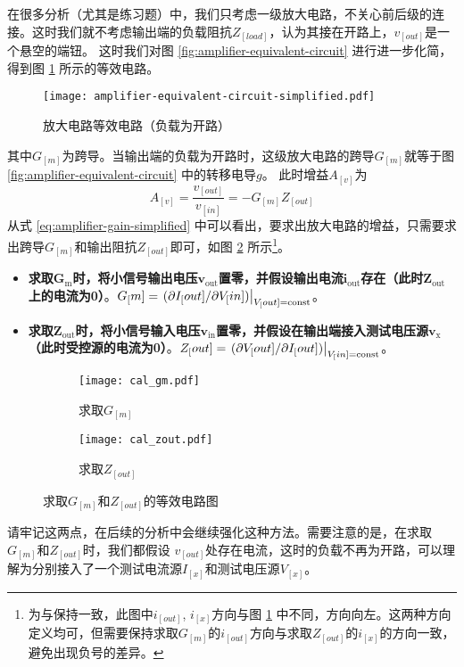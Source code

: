 在很多分析（尤其是练习题）中，我们只考虑一级放大电路，不关心前后级的连接。这时我们就不考虑输出端的负载阻抗$Z_[load]$，认为其接在开路上，$v_[out]$是一个悬空的端钮。
这时我们对图 \ref{fig:amplifier-equivalent-circuit} 进行进一步化简，得到图 \ref{fig:amplifier-equivalent-circuit-simplified} 所示的等效电路。
\begin{figure}[h!tb]
    \centering
    \texttt{[image: amplifier-equivalent-circuit-simplified.pdf]}
    \caption{放大电路等效电路（负载为开路）}
    \label{fig:amplifier-equivalent-circuit-simplified}
\end{figure}
其中$G_[m]$为跨导。当输出端的负载为开路时，这级放大电路的跨导$G_[m]$就等于图 \ref{fig:amplifier-equivalent-circuit} 中的转移电导$g$。
此时增益$A_[v]$为
\begin{equation}
    A_[v] = \frac{v_[out]}{v_[in]} = -G_[m] Z_[out]
    \label{eq:amplifier-gain-simplified}
\end{equation}
从式 \ref{eq:amplifier-gain-simplified} 中可以看出，要求出放大电路的增益，只需要求出跨导$G_[m]$和输出阻抗$Z_[out]$即可，如图 \ref{fig:get-gm-zout} 所示\footnote{为与\cite{Analog-CMOS}保持一致，此图中$i_[out]$, $i_[x]$方向与图 \ref{fig:amplifier-equivalent-circuit-simplified} 中不同，方向向左。这两种方向定义均可，但需要保持求取$G_[m]$的$i_[out]$方向与求取$Z_[out]$的$i_[x]$的方向一致，避免出现负号的差异。}。
\begin{itemize}
    \item \textbf{求取}$\bm{G_{\mathrm{m}}}$\textbf{时，将小信号输出电压}$\bm{v_{\mathrm{out}}}$\textbf{置零，并假设输出电流}$\bm{i_{\mathrm{out}}}$\textbf{存在（此时}$\bm{Z_{\mathrm{out}}}$\textbf{上的电流为0）}。$G_[m] = \eval{({\partial I_[out]}/{\partial V_[in]})}_{V_[out]=\text{const}}$。
    \item \textbf{求取}$\bm{Z_{\mathrm{out}}}$\textbf{时，将小信号输入电压}$\bm{v_{\mathrm{in}}}$\textbf{置零，并假设在输出端接入测试电压源}$\bm{v_{\mathrm{x}}}$\textbf{（此时受控源的电流为0）}。$Z_[out] = \eval{({\partial V_[out]}/{\partial I_[out]})}_{V_[in]=\text{const}}$。
\end{itemize}
\begin{figure}[htp!]
    \centering
    \begin{subfigure}[b]{0.48\textwidth}
        \centering
        \texttt{[image: cal\_gm.pdf]}
        \caption{求取$G_[m]$}
    \end{subfigure}
    \begin{subfigure}[b]{0.48\textwidth}
        \centering
        \texttt{[image: cal\_zout.pdf]}
        \caption{求取$Z_[out]$}
    \end{subfigure}
    \caption{求取$G_[m]$和$Z_[out]$的等效电路图}
    \label{fig:get-gm-zout}
\end{figure}
请牢记这两点，在后续的分析中会继续强化这种方法。需要注意的是，在\textcolor{deep-blue}{求取$G_[m]$和$Z_[out]$时}，我们都\textcolor{deep-blue}{假设} $v_[out]$处存在电流，这时的\textcolor{deep-blue}{负载不再为开路}，可以理解为分别接入了一个测试电流源$I_[x]$和测试电压源$V_[x]$。

